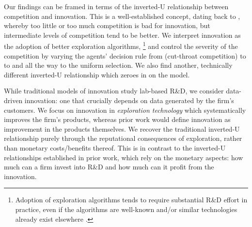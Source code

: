 Our findings can be framed in terms of the inverted-U relationship between competition and innovation. This is a well-established concept, dating back to \cite{Schumpeter-42}, whereby too little or too much competition is bad for innovation, but intermediate levels of competition tend to be better. %
We interpret innovation as the adoption of better exploration algorithms,%
\footnote{Adoption of exploration algorithms tends to require substantial R\&D effort in practice, even if the algorithms are well-known and/or similar technologies already exist elsewhere \citep[\eg see][]{DS-arxiv}.}
and control the severity of the competition by varying the agents' decision rule from \HardMax (cut-throat competition) to \HardMaxRandom to \SoftMaxRandom and all the way to the uniform selection.
We also find another, technically different inverted-U relationship which zeroes in on the \HardMaxRandom model.

While traditional models of innovation study lab-based R\&D, we consider data-driven innovation: one that crucially depends on data generated by the firm's customers.
We focus on innovation in \emph{exploration technology} which systematically improves the firm's products, whereas prior work would define innovation as improvement in the products themselves. We recover the traditional inverted-U relationship purely through the reputational consequences of exploration, rather than monetary costs/benefits thereof. This is in contrast to the inverted-U relationships established in prior work, which rely on the monetary aspects: how much can a firm invest into  R\&D and how much can it profit from the innovation.







